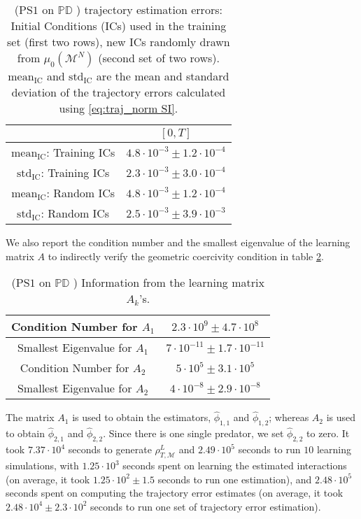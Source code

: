 \documentclass[11pt]{article}
\newcommand{\mM}{\mathcal{M}}
\newcommand{\idxcl}{k}
\newcommand{\intkernel}{\phi}
\newcommand{\lintkernel}{\widehat{\intkernel}}
\newcommand{\probIC}{\mu_0}
\newcommand{\muX}{\probIC(\mM^N)}
\begin{document}
\begin{table}[H]
\centering
\small{\begin{tabular}{| c || c |} 
\hline
                                        & $[0, T]$                                \\
\hline
$\text{mean}_{\text{IC}}$: Training ICs & $4.8 \cdot 10^{-3} \pm 1.2 \cdot 10^{-4}$ \\
\hline
$\text{std}_{\text{IC}}$:  Training ICs & $2.3 \cdot 10^{-3} \pm 3.0 \cdot 10^{-4}$ \\
\hline   
\hline         
$\text{mean}_{\text{IC}}$: Random ICs   & $4.8 \cdot 10^{-3} \pm 1.2 \cdot 10^{-4}$ \\
\hline
$\text{std}_{\text{IC}}$:  Random ICs   & $2.5 \cdot 10^{-3} \pm 3.9 \cdot 10^{-3}$ \\
\hline   
\end{tabular}}
\caption{(PS$1$ on  $ \mathbb{PD} $ ) trajectory estimation errors: Initial Conditions (ICs) used in the training set (first two rows), new ICs randomly drawn from $\muX$ (second set of two rows).  $\text{mean}_{\text{IC}}$ and $\text{std}_{\text{IC}}$ are the mean and standard deviation of the trajectory errors calculated using \eqref{eq:traj_norm SI}.}
\label{tab:PS1_on_PD_traj_err}
\end{table}
We also report the condition number and the smallest eigenvalue of the learning matrix $A$ to indirectly verify the geometric coercivity condition in table \ref{tab:PS1_on_PD_coer}.
\begin{table}[H]
\centering
\small{\begin{tabular}{ c || c } 
\hline
Condition Number for $A_1$    & $2.3 \cdot 10^{9} \pm 4.7 \cdot 10^{8}$ \\ 
\hline
Smallest Eigenvalue for $A_1$ & $7 \cdot 10^{-11} \pm 1.7 \cdot 10^{-11}$ \\
\hline
\hline
Condition Number for $A_2$    & $5 \cdot 10^{5} \pm 3.1 \cdot 10^{5}$ \\ 
\hline
Smallest Eigenvalue for $A_2$ & $4 \cdot 10^{-8} \pm 2.9 \cdot 10^{-8}$ \\
\hline
\end{tabular}}
\caption{(PS$1$ on  $ \mathbb{PD} $ ) Information from the learning matrix $A_{\idxcl}$'s.}
\label{tab:PS1_on_PD_coer}
\end{table}
The matrix $A_1$ is used to obtain the estimators, $\lintkernel_{1, 1}$ and $\lintkernel_{1, 2}$; whereas $A_2$ is used to obtain $\lintkernel_{2, 1}$ and $\lintkernel_{2, 2}$.  Since there is one single predator, we set $\lintkernel_{2, 2}$ to zero.  It took $7.37 \cdot 10^{4}$ seconds to generate $\rho_{T, \mM}^L$ and $2.49 \cdot 10^{5}$ seconds to run $10$ learning simulations, with $1.25 \cdot 10^{3}$ seconds spent on learning the estimated interactions (on average, it took $1.25 \cdot 10^{2} \pm 1.5$ seconds to run one estimation), and $2.48 \cdot 10^{5}$ seconds spent on computing the trajectory error estimates (on average, it took $2.48 \cdot 10^{4} \pm 2.3 \cdot 10^{2}$ seconds to run one set of trajectory error estimation).
%


%
\end{document}
